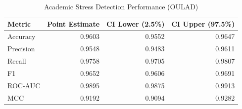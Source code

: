\begin{table}[h]
\centering
\caption{Academic Stress Detection Performance (OULAD)}
\begin{tabular}{lrrr}
\toprule
Metric & Point Estimate & CI Lower (2.5\%) & CI Upper (97.5\%) \\
\midrule
  Accuracy & 0.9603 & 0.9552 & 0.9647 \\
  Precision & 0.9548 & 0.9483 & 0.9611 \\
  Recall & 0.9758 & 0.9705 & 0.9807 \\
  F1 & 0.9652 & 0.9606 & 0.9691 \\
  ROC-AUC & 0.9895 & 0.9875 & 0.9913 \\
  MCC & 0.9192 & 0.9094 & 0.9282 \\
\bottomrule
\end{tabular}
\end{table}